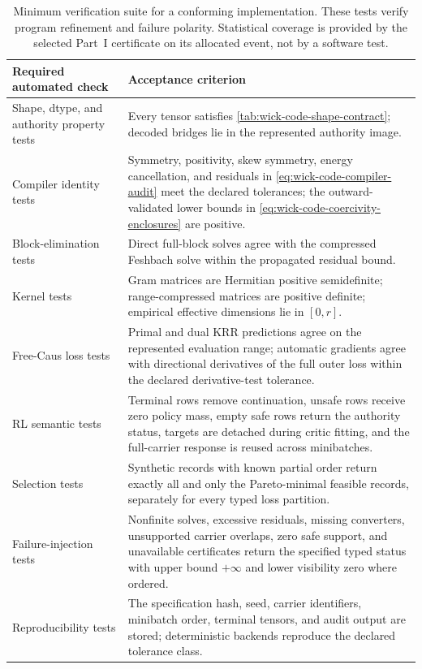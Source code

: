 \documentclass[11pt]{article}
\numberwithin{section}{part}
\theoremstyle{plain}
\theoremstyle{definition}
\theoremstyle{remark}
\begin{document}
\begin{table}[htbp]
\centering
\small
\begin{tabular}{@{}p{.28\linewidth}p{.62\linewidth}@{}}
\toprule
Required automated check & Acceptance criterion\\
\midrule
Shape, dtype, and authority property tests
& Every tensor satisfies \cref{tab:wick-code-shape-contract}; decoded bridges
  lie in the represented authority image.\\
Compiler identity tests
& Symmetry, positivity, skew symmetry, energy cancellation, and residuals in
  \eqref{eq:wick-code-compiler-audit} meet the declared tolerances; the
  outward-validated lower bounds in
  \eqref{eq:wick-code-coercivity-enclosures} are positive.\\
Block-elimination tests
& Direct full-block solves agree with the compressed Feshbach solve within the
  propagated residual bound.\\
Kernel tests
& Gram matrices are Hermitian positive semidefinite; range-compressed matrices
  are positive definite; empirical effective dimensions lie in
  \([0,r]\).\\
Free-Caus loss tests
& Primal and dual KRR predictions agree on the represented evaluation range;
  automatic gradients agree with directional derivatives of the full outer
  loss within the declared derivative-test tolerance.\\
RL semantic tests
& Terminal rows remove continuation, unsafe rows receive zero policy mass,
  empty safe rows return the authority status, targets are detached during
  critic fitting, and the full-carrier response is reused across minibatches.\\
Selection tests
& Synthetic records with known partial order return exactly all and only the
  Pareto-minimal feasible records, separately for every typed loss partition.\\
Failure-injection tests
& Nonfinite solves, excessive residuals, missing converters, unsupported
  carrier overlaps, zero safe support, and unavailable certificates return the
  specified typed status with upper bound \(+\infty\) and lower visibility
  zero where ordered.\\
Reproducibility tests
& The specification hash, seed, carrier identifiers, minibatch order, terminal
  tensors, and audit output are stored; deterministic backends reproduce the
  declared tolerance class.\\
\bottomrule
\end{tabular}
\caption{Minimum verification suite for a conforming implementation.  These
tests verify program refinement and failure polarity.  Statistical coverage is
provided by the selected Part~I certificate on its allocated event, not by a
software test.}
\label{tab:wick-code-verification-suite}
\end{table}
\end{document}

